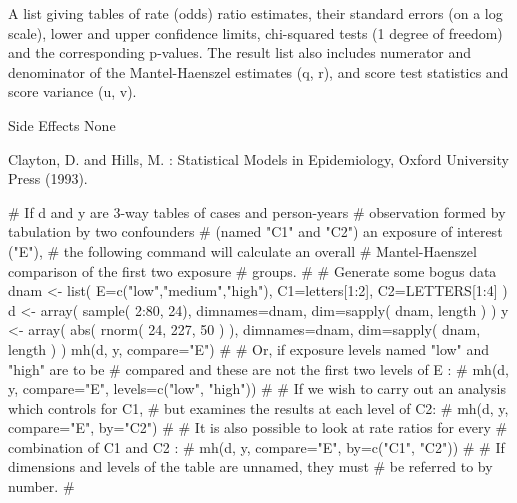 \begin{Details}\relax
\end{Details}
\begin{Value}
A list giving tables of rate (odds) ratio estimates, their standard errors 
(on a log scale), lower and upper confidence limits, chi-squared tests 
(1 degree of freedom) and the corresponding p-values. The result list also 
includes numerator and denominator of the Mantel-Haenszel estimates (q, r), 
and score test statistics and score variance (u, v).
\end{Value}
\begin{Section}{Side Effects}
None
\end{Section}
\begin{References}\relax
Clayton, D. and Hills, M. : Statistical Models in Epidemiology, Oxford 
University Press (1993).
\end{References}
\begin{SeeAlso}\relax
{}
\end{SeeAlso}
\begin{Examples}
\begin{ExampleCode}
# If d and y are 3-way tables of cases and person-years 
# observation formed by tabulation by two confounders 
# (named "C1" and "C2") an exposure of interest ("E"), 
# the following command will calculate an overall 
# Mantel-Haenszel comparison of the first two exposure 
# groups.
#
# Generate some bogus data
dnam <- list( E=c("low","medium","high"), C1=letters[1:2], C2=LETTERS[1:4] )
d <- array( sample( 2:80, 24),
            dimnames=dnam, dim=sapply( dnam, length ) )
y <- array( abs( rnorm( 24, 227, 50 ) ),
            dimnames=dnam, dim=sapply( dnam, length ) )
mh(d, y, compare="E")
#
# Or, if exposure levels named "low" and "high" are to be 
# compared and these are not the first two levels of E :
#
mh(d, y, compare="E", levels=c("low", "high"))
#
# If we wish to carry out an analysis which controls for C1, 
# but examines the results at each level of C2:
#
mh(d, y, compare="E", by="C2")
#
# It is also possible to look at rate ratios for every 
# combination of C1 and C2 :
#
mh(d, y, compare="E", by=c("C1", "C2"))
#
# If dimensions and levels of the table are unnamed, they must 
# be referred to by number.
#
\end{ExampleCode}
\end{Examples}

